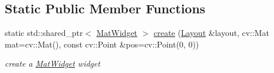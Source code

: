 \subsection*{Static Public Member Functions}
\begin{DoxyCompactItemize}
\item 
static std\+::shared\+\_\+ptr$<$ \hyperlink{classcanvascv_1_1MatWidget}{Mat\+Widget} $>$ \hyperlink{classcanvascv_1_1MatWidget_aca0ea4c34265c70f59a929968ca64aba}{create} (\hyperlink{classcanvascv_1_1Layout}{Layout} \&layout, cv\+::\+Mat mat=cv\+::\+Mat(), const cv\+::\+Point \&pos=cv\+::\+Point(0, 0))
\begin{DoxyCompactList}\small\item\em create a \hyperlink{classcanvascv_1_1MatWidget}{Mat\+Widget} widget \end{DoxyCompactList}\end{DoxyCompactItemize}

